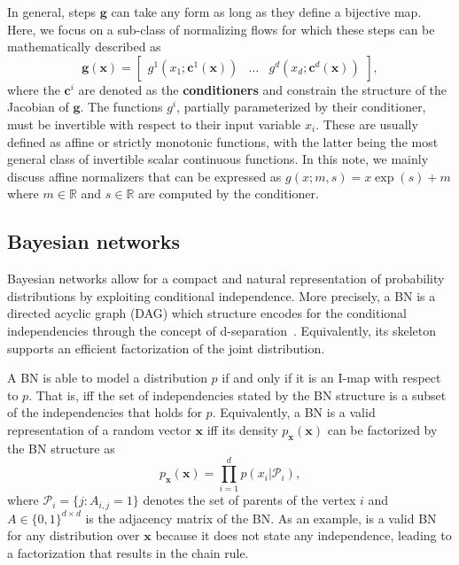 In general, steps $\mathbf{g}$ can take any form as long as they define a bijective map. Here, we focus on a sub-class of normalizing flows for which these steps can be mathematically described as
\begin{equation*}
    \mathbf{g}(\mathbf{x}) = \begin{bmatrix}
g^1(x_{1}; \mathbf{c}^1(\mathbf{x})) & \hdots & g^d(x_{d}; \mathbf{c}^d(\mathbf{x}))
\end{bmatrix},\label{eq:gnf}
\end{equation*}
where the $\mathbf{c}^i$ are denoted as the \textbf{conditioners} and constrain the structure of the Jacobian of $\mathbf{g}$. The functions $g^i$, partially parameterized by their conditioner, must be invertible with respect to their input variable $x_i$. These are usually defined as affine or strictly monotonic functions, with the latter being the most general class of invertible scalar continuous functions.
In this note, we mainly discuss affine normalizers that can be expressed as
$g(x;m, s) = x\exp(s) + m$
where $m \in \mathbb{R}$ and $s \in \mathbb{R}$ are computed by the conditioner.



\subsection{Bayesian networks}

Bayesian networks allow for a compact and natural representation of probability distributions by exploiting conditional independence. More precisely, a BN is a directed acyclic graph (DAG) which structure encodes for the conditional independencies through the concept of d-separation~\citep{geiger_d-separation_1990}. Equivalently, its skeleton supports an efficient factorization of the joint distribution.

A BN is able to model a distribution $p$ if and only if it is an I-map with respect to $p$. That is, iff the set of independencies stated by the BN structure is a subset of the independencies that holds for $p$. Equivalently, a BN is a valid representation of a random vector $\mathbf{x}$ iff its density $p_{\mathbf{x}}(\mathbf{x})$ can be factorized by the BN structure as
\begin{equation}
    p_{\mathbf{x}}(\mathbf{x}) = \prod^d_{i=1}p(x_i|\mathcal{P}_i),\label{eq:BN-fact}
\end{equation}
where  $\mathcal{P}_i = \{j: A_{i,j} = 1 \}$ denotes the set of parents of the vertex $i$ and $A \in \{0, 1\}^{d\times d}$ is the adjacency matrix of the BN. As an example,  is a valid BN for any distribution over $\mathbf{x}$ because it does not state any independence, leading to a factorization that results in the chain rule.


